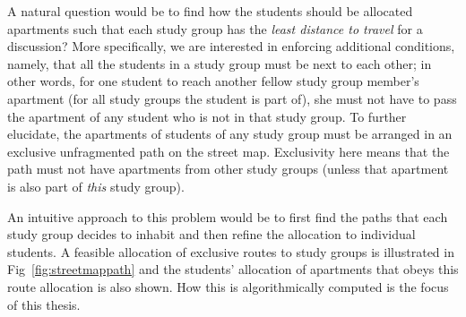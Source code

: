\documentclass[MS,synopsis]{iitmdiss}
\begin{document}
A natural question would be to find how the students should be
allocated apartments such that each study group has the {\em least
  distance to travel} for a discussion? More specifically, we are
interested in enforcing additional conditions, namely, that all the
students in a study group must be next to each other; in other words,
for one student to reach another fellow study group member's apartment
(for all study groups the student is part of), she must not have to
pass the apartment of any student who is not in that study group. To
further elucidate, the apartments of students of any study group must
be arranged in an exclusive unfragmented path on the street
map. Exclusivity here means that the path must not have apartments
from other study groups (unless that apartment is also part of {\em
  this} study group).

An intuitive approach to this problem would be to first find the paths
that each study group decides to inhabit and then refine the
allocation to individual students. A feasible allocation of exclusive
routes to study groups is illustrated in Fig~\ref{fig:streetmappath}
and the students' allocation of apartments that obeys this route
allocation is also shown. How this is algorithmically
computed is the focus of this thesis.

\end{document}
